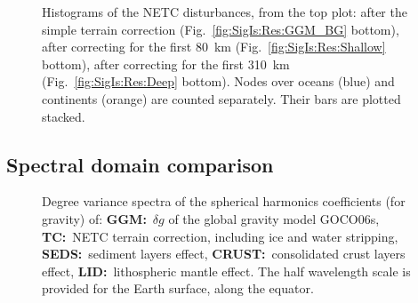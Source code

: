 \begin{figure}
    \begin{adjustbox}{center}
    \end{adjustbox}
    \caption[Histograms of the NETC disturbances, including the first \num{80} and \SI{310}{\kilo \metre} corrections.]{
        Histograms of the NETC disturbances, from the top plot: after the simple terrain correction (Fig.~\ref{fig:SigIs:Res:GGM_BG} bottom), after correcting for the first \SI{80}{\kilo \metre} (Fig.~\ref{fig:SigIs:Res:Shallow} bottom), after correcting for the first \SI{310}{\kilo \metre} (Fig.~\ref{fig:SigIs:Res:Deep} bottom).
        Nodes over oceans (blue) and continents (orange) are counted separately. Their bars are plotted stacked.
    }
    \label{fig:SigIs:Res:HistBGs}
\end{figure}

\FloatBarrier

\subsection{Spectral domain comparison}
\label{ss:SigIs:Results:Spectral}

\begin{figure}
    \begin{adjustbox}{center}
    \end{adjustbox}
    \caption[Degree variance spectra of the SH coefficients for the GGM and the forward modelled corrections.]{
        Degree variance spectra of the spherical harmonics coefficients (for gravity) of:
        \textbf{{GGM}:}~$\delta g$ of the global gravity model {GOCO06s},
        \textbf{{TC}:}~NETC terrain correction, including ice and water stripping,
        \textbf{{SEDS}:}~sediment layers effect,
        \textbf{{CRUST}:}~consolidated crust layers effect,
        \textbf{{LID}:}~lithospheric mantle effect.
        The half wavelength scale is provided for the Earth surface, along the equator.}
    \label{fig:SigIs:Spec:DegVarAll}
\end{figure}

